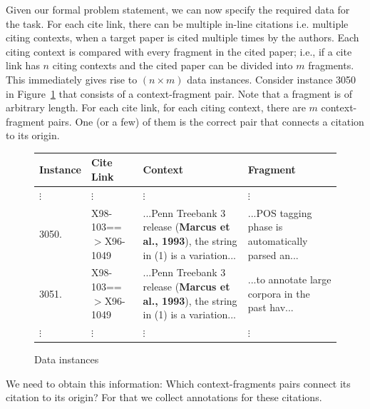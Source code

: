 Given our formal problem statement, we can now specify the required data for the task. For each cite link, there can be multiple in-line citations i.e. multiple citing contexts, when a target paper is cited multiple times by the authors. Each citing context is compared with every fragment in the cited paper; i.e., if a cite link has $n$ citing contexts and the cited paper can be divided into $m$ fragments.  This immediately gives rise to $(n \times m)$ data instances. Consider instance 3050 in Figure~\ref{fig:data_instances} that consists of a context-fragment pair. Note that a fragment is of arbitrary length. For each cite link, for each citing context, there are $m$ context-fragment pairs. One (or a few) of them is the correct pair that connects a citation to its origin.

\begin{figure}[h]
\centering
	\begin{tabular}{ l | l | p{4cm} | p{4cm}}
		Instance & Cite Link & Context & Fragment\\
		\hline
		$\vdots$ & $\vdots$ & $\vdots$ & $\vdots$\\
		3050. & X98-103==$>$X96-1049 & ...Penn Treebank 3 release (\textbf{Marcus et al., 1993}), the string in (1) is a variation... & ...POS tagging phase is automatically parsed an...\\
		\hline
		3051. & X98-103==$>$X96-1049 & ...Penn Treebank 3 release (\textbf{Marcus et al., 1993}), the string in (1) is a variation... & ...to annotate large corpora in the past hav...\\
		$\vdots$ & $\vdots$ & $\vdots$ & $\vdots$
	\end{tabular}
\caption{Data instances}
\label{fig:data_instances}
\end{figure}

We need to obtain this information: Which context-fragments pairs connect its citation to its origin? For that we collect annotations for these citations.
